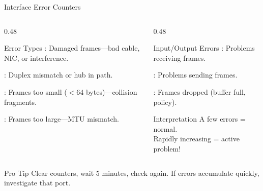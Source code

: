\documentclass[aspectratio=169]{beamer}  %
\begin{document}
\begin{frame}{Interface Error Counters}
    \begin{columns}[T]
        \begin{column}{0.48\textwidth}
            \begin{block}{Error Types}
                : Damaged frames---bad cable, NIC, or interference.
                
                \vspace{0.3em}
                : Duplex mismatch or hub in path.
                
                \vspace{0.3em}
                : Frames too small ($<$64 bytes)---collision fragments.
                
                \vspace{0.3em}
                : Frames too large---MTU mismatch.
            \end{block}
        \end{column}
        \begin{column}{0.48\textwidth}
            \begin{block}{Input/Output Errors}
                : Problems receiving frames.
                
                \vspace{0.3em}
                : Problems sending frames.
                
                \vspace{0.3em}
                : Frames dropped (buffer full, policy).
            \end{block}
            
            \vspace{0.3em}
            \begin{alertblock}{Interpretation}
                A few errors = normal. \\
                Rapidly increasing = active problem!
            \end{alertblock}
        \end{column}
    \end{columns}
    
    \vspace{0.3em}
    \begin{exampleblock}{Pro Tip}
        Clear counters, wait 5 minutes, check again. If errors accumulate quickly, investigate that port.
    \end{exampleblock}
\end{frame}
\end{document}
